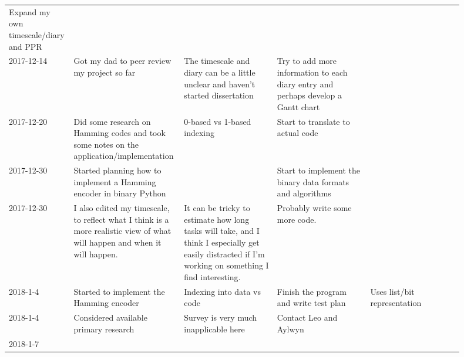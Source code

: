 \documentclass{article}
\begin{document}
\begin{center}
{\begin{longtable}{p{0.1\linewidth} p{0.2\linewidth} p{0.2\linewidth} p{0.2\linewidth} p{0.2\linewidth}}
    Expand my own timescale/diary and PPR &

    \\ 2017-12-14 &

    Got my dad to peer review my project so far &

    The timescale and diary can be a little unclear and haven't started
    dissertation &

    Try to add more information to each diary entry and perhaps develop a Gantt
    chart &

    \\ 2017-12-20 &

    Did some research on Hamming codes and took some notes on the
    application/implementation &

    0-based vs 1-based indexing &

    Start to translate to actual code &

    \\ 2017-12-30 &

    Started planning how to implement a Hamming encoder in binary Python &

    &

    Start to implement the binary data formats and algorithms &

    \\ 2017-12-30 &

    I also edited my timescale, to reflect what I think is a more realistic view
    of what will happen and when it will happen. &

    It can be tricky to estimate how long tasks will take, and I think I
    especially get easily distracted if I'm working on something I find
    interesting. &

    Probably write some more code.

    \\ 2018-1-4 &

    Started to implement the Hamming encoder &

    Indexing into data vs code &

    Finish the program and write test plan &

    Uses list/bit representation \\ 2018-1-4 &

    Considered available primary research &

    Survey is very much inapplicable here &

    Contact Leo and Aylwyn &

    \\ 2018-1-7 &


\end{longtable}}
\end{center}
\end{document}
